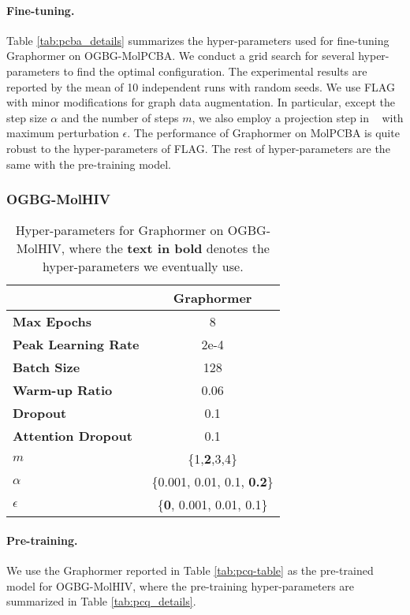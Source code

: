 \documentclass{article}
\begin{document}
\paragraph{Fine-tuning.} Table \ref{tab:pcba_details} summarizes the hyper-parameters used for fine-tuning Graphormer on OGBG-MolPCBA. We conduct a grid search for several hyper-parameters to find the optimal configuration. The experimental results are reported by the mean of 10 independent runs with random seeds. We use FLAG~\cite{kong2020flag} with minor modifications for graph data augmentation. In particular, except the step size $\alpha$ and the number of steps $m$, we also employ a projection step in ~\cite{zhu2020freelb} with maximum perturbation $\epsilon$. The performance of Graphormer on MolPCBA is quite robust to the hyper-parameters of FLAG. The rest of hyper-parameters are the same with the pre-training model.


\subsubsection{OGBG-MolHIV}

\begin{table*}[h]
\centering 
\caption{Hyper-parameters for Graphormer on OGBG-MolHIV, where the \textbf{text in bold} denotes the hyper-parameters we eventually use. } \label{tab:hiv_details}
\begin{threeparttable}
\begin{tabular}{lc}
\toprule
& Graphormer \\ \hline
\textbf{Max Epochs} & 8 \\
\textbf{Peak Learning Rate} & 2e-4  \\ 
\textbf{Batch Size} & 128 \\ 
\textbf{Warm-up Ratio} & 0.06 \\ 
\textbf{Dropout} & 0.1 \\ 
\textbf{Attention Dropout} & 0.1 \\ 
\textbf{$m$} & \{1,\textbf{2},3,4\} \\ 
\textbf{$\alpha$} & \{0.001, 0.01, 0.1, \textbf{0.2}\} \\ 
\textbf{$\epsilon$} & \{\textbf{0}, 0.001, 0.01, 0.1\} \\ 
\bottomrule
\end{tabular}
\end{threeparttable}
\end{table*}


\paragraph{Pre-training.} We use the Graphormer reported in Table \ref{tab:pcq-table} as the pre-trained model for OGBG-MolHIV, where the pre-training hyper-parameters are summarized in Table \ref{tab:pcq_details}.
\end{document}
